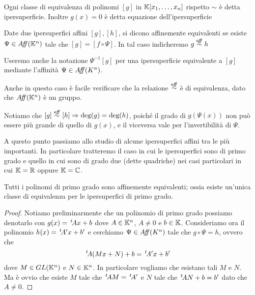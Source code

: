 \documentclass[a4paper,12pt]{article}
\begin{document}
\begin{definition}
	Ogni classe di equivalenza di polinomi $[g]$ in $\mathbb K[x_1,\dots,x_n]$ rispetto $\sim$ è detta ipersuperficie.
	Inoltre $g(x)=0$ è detta equazione dell'ipersuperficie
\end{definition}

\begin{definition}
	Date due ipersuperfici affini $[g],[h]$, si dicono affinemente equivalenti se esiste $\Psi\in A\!f\!\!f(\mathbb K^n)$ tale che $[g]=[f\circ\Psi]$.
	In tal caso indicheremo $g\stackrel{a\!f\!\!f}{\sim} h$
\end{definition}
\begin{remark}
	Useremo anche la notazione $\Psi^{-1}[g]$ per una ipersuperficie equivalente a $[g]$ mediante l'affinità $\Psi \in A\!f\!\!f(K^n)$.
\end{remark}
\begin{remark}
	Anche in questo caso è facile verificare che la relazione $\stackrel{a\!f\!\!f}{\sim}$ è di equivalenza, dato che $A\!f\!\!f(\mathbb K^n)$ è un gruppo.
\end{remark}
\begin{remark}
	Notiamo che $[g]\stackrel{a\!f\!\!f}{\sim} [h]\Rightarrow \text{deg}(g)=\text{deg}(h)$,
	poiché il grado di $g(\Psi(x))$ non può essere più grande di quello di $g(x)$, e il viceversa vale per l'invertibilità di $\Psi$.
\end{remark}

A questo punto passiamo allo studio di alcune ipersuperfici affini tra le più importanti. In particolare tratteremo il caso in cui le ipersuperfici
sono di primo grado e quello in cui sono di grado due (dette quadriche) nei casi particolari in cui $\mathbb K=\mathbb R$ oppure $\mathbb K=\mathbb C$.

\begin{proposition}[Grado $1$]
	Tutti i polinomi di primo grado sono affinemente equivalenti;
	ossia esiste un'unica classe di equivalenza per le ipersuperfici di primo grado.
\end{proposition}

\begin{proof}
	Notiamo preliminarmente che un polinomio di primo grado possiamo denotarlo con $g(x)=\, ^{t}\!Ax+b$ dove $A\in \mathbb K^n$, $A\neq 0$ e $b\in \mathbb K$.
	Consideriamo ora il polinomio $h(x)=\, ^{t}\!A'x+b'$ e cerchiamo $\Psi\in A\!f\!\!f(K^n)$ tale che $g\circ \Psi = h$, ovvero che
	\[
		\, ^{t}\!A(Mx+N)+b=\, ^{t}\!A'x+b'
	\]
	dove $M\in GL(\mathbb K^n)$ e $N\in \mathbb K^n$. In particolare vogliamo che esistano tali $M$ e $N$.
	Ma è ovvio che esiste $M$ tale che $\, ^{t}\!AM=\, ^{t}\!A'$ e $N$ tale che $\, ^{t}\!AN+b=b'$ dato che $A\neq 0$.
\end{proof}
\end{document}
